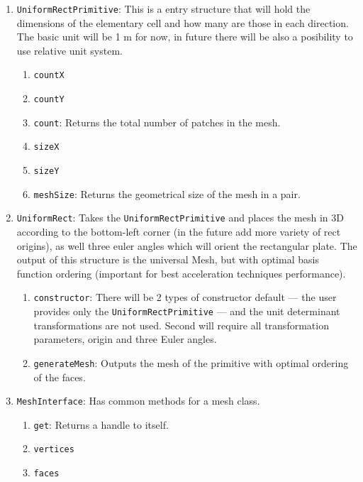 \documentclass[9pt]{article}
\begin{document}
    \begin{enumerate}[label=\Roman*.]
        \item \texttt{UniformRectPrimitive}: This is a entry structure that will hold the dimensions of the elementary cell and how many are those in each direction. The basic unit will be 1 m for now, in future there will be also a posibility to use relative unit system.
        \begin{enumerate}[label=\roman*.]
            \item \texttt{countX}
            \item \texttt{countY}
            \item \texttt{count}: Returns the total number of patches in the mesh.
            \item \texttt{sizeX}
            \item \texttt{sizeY}
            \item \texttt{meshSize}: Returns the geometrical size of the mesh in a pair.
        \end{enumerate}
        \item \texttt{UniformRect}: Takes the \texttt{UniformRectPrimitive} and places the mesh in 3D according to the bottom-left corner (in the future add more variety of rect origins), as well three euler angles which will orient the rectangular plate. The output of this structure is the universal Mesh, but with optimal basis function ordering (important for best acceleration techniques performance).
        \begin{enumerate}[label=\roman*.]
            \item \texttt{constructor}: There will be 2 types of constructor default --- the user provides only the \texttt{UniformRectPrimitive} --- and the unit determinant transformations are not used. Second will require all transformation parameters, origin and three Euler angles.
            \item \texttt{generateMesh}: Outputs the mesh of the primitive with optimal ordering of the faces.
        \end{enumerate}
        \item \texttt{MeshInterface}: Has common methods for a mesh class.
        \begin{enumerate}[label=\roman*.]
            \item \texttt{get}: Returns a handle to itself.
            \item \texttt{vertices}
            \item \texttt{faces}

\end{enumerate}
\end{enumerate}
\end{document}
